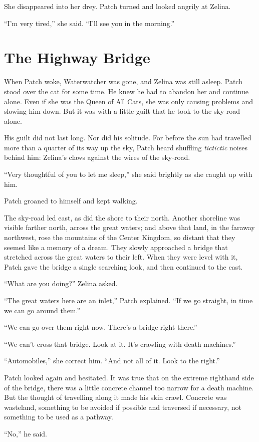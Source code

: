 \documentclass[ebook,oneside,openany,17pt]{memoir}
\renewcommand{\thechapter}{\Roman{chapter}}
\newcounter{sections}
\newcommand{\sections}[1]{%
  \section*{#1}
  \addtocounter{sections}{1}%
  \pdfbookmark[1]{#1}{section.\thechapter.\thesections}}
\begin{document}
She disappeared into her drey. Patch turned and looked angrily at
Zelina.

“I’m very tired,” she said. “I’ll see you in the morning.”


\sections{The Highway Bridge}

When Patch woke, Waterwatcher was gone, and Zelina was still
asleep. Patch stood over the cat for some time. He knew he had to
abandon her and continue alone. Even if she was the Queen of All Cats,
she was only causing problems and slowing him down. But it was with a
little guilt that he took to the sky-road alone.

His guilt did not last long. Nor did his solitude. For before the sun
had travelled more than a quarter of its way up the sky, Patch heard
shuffling \emph{tictictic} noises behind him: Zelina’s claws against
the wires of the sky-road.

“Very thoughtful of you to let me sleep,” she said brightly as she
caught up with him.

Patch groaned to himself and kept walking.

The sky-road led east, as did the shore to their north. Another
shoreline was visible farther north, across the great waters; and
above that land, in the faraway northwest, rose the mountains of the
Center Kingdom, so distant that they seemed like a memory of a
dream. They slowly approached a bridge that stretched across the great
waters to their left. When they were level with it, Patch gave the
bridge a single searching look, and then continued to the east.

“What are you doing?” Zelina asked.

“The great waters here are an inlet,” Patch explained. “If we go
straight, in time we can go around them.”

“We can go over them right now. There’s a bridge right there.”

“We can’t cross that bridge. Look at it. It’s crawling with death
machines.”

“Automobiles,” she correct him. “And not all of it. Look to the
right.”

Patch looked again and hesitated. It was true that on the extreme
righthand side of the bridge, there was a little concrete channel too
narrow for a death machine. But the thought of travelling along it
made his skin crawl. Concrete was wasteland, something to be avoided
if possible and traversed if necessary, not something to be used as a
pathway.

“No,” he said.
\end{document}
